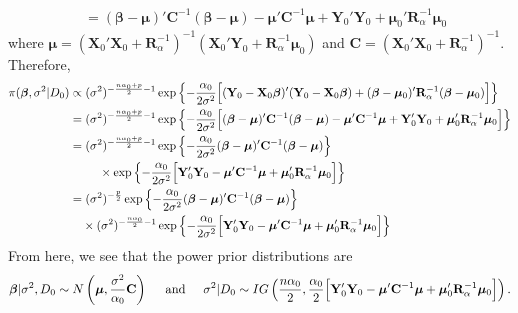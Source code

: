 \documentclass[11pt]{article}
\begin{document}
\begin{itemize}
\begin{align*}
&= (\boldsymbol\beta - \boldsymbol\mu)'\mathbf{C}^{-1}(\boldsymbol\beta-\boldsymbol\mu) - \boldsymbol\mu'\mathbf{C}^{-1}\boldsymbol\mu + \mathbf{Y}_0'\mathbf{Y}_0 + \boldsymbol\mu_0'\mathbf{R}_\alpha^{-1}\boldsymbol\mu_0
\end{align*}
where $\boldsymbol\mu = (\mathbf{X}_0'\mathbf{X}_0 + \mathbf{R}_\alpha^{-1})^{-1}(\mathbf{X}_0'\mathbf{Y}_0 + \mathbf{R}_\alpha^{-1}\boldsymbol\mu_0)$ and $\mathbf{C} = (\mathbf{X}_0'\mathbf{X}_0 + \mathbf{R}_\alpha^{-1})^{-1}$.  Therefore,
\begin{align*}
\pi(\boldsymbol\beta,\sigma^2|D_0) \propto& \hspace{1mm}(\sigma^2)^{-\frac{n\alpha_0+p}{2} - 1}\exp\left\{-\frac{\alpha_0}{2\sigma^2}\Big{[}(\mathbf{Y}_0-\mathbf{X}_0\boldsymbol\beta)'(\mathbf{Y}_0-\mathbf{X}_0\boldsymbol\beta) + (\boldsymbol\beta - \boldsymbol\mu_0)'\mathbf{R}_\alpha^{-1}(\boldsymbol\beta - \boldsymbol\mu_0)\Big{]} \right\} \\
=&\hspace{1mm} (\sigma^2)^{-\frac{n\alpha_0+p}{2} - 1}\exp\left\{-\frac{\alpha_0}{2\sigma^2}\Big{[}(\boldsymbol\beta - \boldsymbol\mu)'\mathbf{C}^{-1}(\boldsymbol\beta-\boldsymbol\mu) - \boldsymbol\mu'\mathbf{C}^{-1}\boldsymbol\mu + \mathbf{Y}_0'\mathbf{Y}_0 + \boldsymbol\mu_0'\mathbf{R}_\alpha^{-1}\boldsymbol\mu_0\Big{]}\right\} \\
=&\hspace{1mm}(\sigma^2)^{-\frac{n\alpha_0+p}{2} - 1}\exp\left\{-\frac{\alpha_0}{2\sigma^2}(\boldsymbol\beta - \boldsymbol\mu)'\mathbf{C}^{-1}(\boldsymbol\beta-\boldsymbol\mu)\right\} \\
&\hspace{5mm}\times \exp\left\{-\frac{\alpha_0}{2\sigma^2}\Big{[} \mathbf{Y}_0'\mathbf{Y}_0 - \boldsymbol\mu'\mathbf{C}^{-1}\boldsymbol\mu + \boldsymbol\mu_0'\mathbf{R}_\alpha^{-1}\boldsymbol\mu_0\Big{]}\right\} \\
=&\hspace{1mm} (\sigma^2)^{-\frac{p}{2}}\exp\left\{-\frac{\alpha_0}{2\sigma^2}(\boldsymbol\beta - \boldsymbol\mu)'\mathbf{C}^{-1}(\boldsymbol\beta-\boldsymbol\mu)\right\} \\
&\times  (\sigma^2)^{-\frac{n\alpha_0}{2} - 1} \exp\left\{-\frac{\alpha_0}{2\sigma^2}\Big{[} \mathbf{Y}_0'\mathbf{Y}_0 - \boldsymbol\mu'\mathbf{C}^{-1}\boldsymbol\mu + \boldsymbol\mu_0'\mathbf{R}_{\alpha}^{-1}\boldsymbol\mu_0\Big{]}\right\}
\end{align*}
From here, we see that the power prior distributions are
\begin{align*}
\boldsymbol\beta|\sigma^2,D_0 \sim N\left(\boldsymbol\mu,\frac{\sigma^2}{\alpha_0}\mathbf{C}\right) \hspace{5mm}\text{and}\hspace{5mm}\sigma^2|D_0\sim IG\left(\frac{n\alpha_0}{2},\frac{\alpha_0}{2}\Big{[} \mathbf{Y}_0'\mathbf{Y}_0 - \boldsymbol\mu'\mathbf{C}^{-1}\boldsymbol\mu + \boldsymbol\mu_0'\mathbf{R}_\alpha^{-1}\boldsymbol\mu_0\Big{]} \right).
\end{align*}


\end{itemize}
\end{document}
